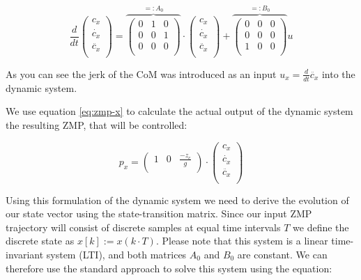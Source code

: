 \documentclass[english,ngerman]{KITreprt}
\begin{document}
\begin{equation} \label{eq:dyn-system}
\frac{d}{dt} \left(\begin{array}{c}
c_x \\
\dot{c_x} \\
\ddot{c_x} \\
\end{array} \right)
=
\overbrace{
\left(\begin{array}{ccc}
0 & 1 & 0\\
0 & 0 & 1 \\
0 & 0 & 0 \\
\end{array}\right)
}^{ =: A_0}
\cdot
\left(\begin{array}{c}
c_x \\
\dot{c_x} \\
\ddot{c_x} \\
\end{array}\right)
+
\overbrace{
\left(\begin{array}{ccc}
0 & 0 & 0\\
0 & 0 & 0\\
1 & 0 & 0\\
\end{array}\right)
}^{ =: B_0}
u
\end{equation}

As you can see the jerk of the CoM was introduced as an input
$u_x = \frac{d}{dt} \ddot{c_x}$ into the dynamic system.

We use equation \ref{eq:zmp-x} to calculate the actual output of the
dynamic system the resulting ZMP, that will be controlled:

\begin{equation} \label{eq:zmp-x-output}
p_x =
\left(\begin{array}{ccc}
1 & 0 & \frac{-z_c}{g} \\
\end{array}\right)
\cdot
\left(\begin{array}{c}
c_x \\
\dot{c_x} \\
\ddot{c_x} \\
\end{array}\right)
\end{equation}

Using this formulation of the dynamic system we need to derive the
evolution of our state vector using the state-transition matrix. Since
our input ZMP trajectory will consist of discrete samples at equal time
intervals $T$ we define the discrete state as $x[k] := x(k \cdot T)$.
Please note that this system is a linear time-invariant system (LTI),
and both matrices $A_0$ and $B_0$ are constant. We can therefore use the
standard approach to solve this system using the equation:
\end{document}
